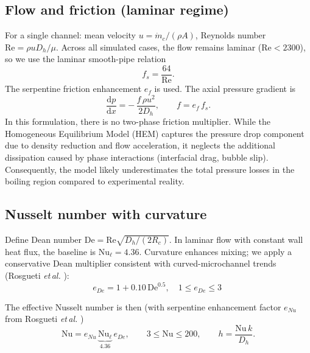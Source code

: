 \documentclass[11pt,a4paper]{article}
\begin{document}
\subsection{Flow and friction (laminar regime)}
For a single channel: mean velocity \(u=\dot m_c/(\rho A)\), Reynolds number \(\mathrm{Re}=\rho u D_h/\mu\). Across all simulated cases, the flow remains laminar (\(\mathrm{Re}<2300\)), so we use the laminar smooth-pipe relation
\begin{equation}
  f_s = \frac{64}{\mathrm{Re}}.
\end{equation}
The serpentine friction enhancement \(e_f\) is used. The axial pressure gradient is
\begin{equation}
  \frac{\mathrm{d}p}{\mathrm{d}x} = -\,\frac{f\,\rho u^2}{2 D_h},\qquad f = e_f\,f_s.
\end{equation}
In this formulation, there is no two-phase friction multiplier. While the Homogeneous Equilibrium Model (HEM) captures the pressure drop component due to density reduction and flow acceleration, it neglects the additional dissipation caused by phase interactions (interfacial drag, bubble slip). Consequently, the model likely underestimates the total pressure losses in the boiling region compared to experimental reality.


\subsection{Nusselt number with curvature}
Define Dean number \(\mathrm{De}=\mathrm{Re}\sqrt{D_h/(2R_c)}\). In laminar flow with constant wall heat flux, the baseline is \(\mathrm{Nu}_\ell=4.36\). Curvature enhances mixing; we apply a conservative Dean multiplier consistent with curved-microchannel trends (Rosgueti \emph{et\,al.} \cite{Rosgueti2022}):
\begin{equation}
  e_{De}=1+0.10\,\mathrm{De}^{0.5},\quad 1\le e_{De}\le 3 \;
\end{equation}

The effective Nusselt number is then (with serpentine enhancement factor \(e_{Nu}\) from Rosgueti \emph{et\,al.} \cite{Rosgueti2022})
\begin{equation}
  \mathrm{Nu}= e_{Nu}\,\underbrace{\mathrm{Nu}_\ell}_{4.36}\,e_{De},\qquad 3\le \mathrm{Nu} \le 200,\qquad h=\frac{\mathrm{Nu}\,k}{D_h}.
\end{equation}
\end{document}
